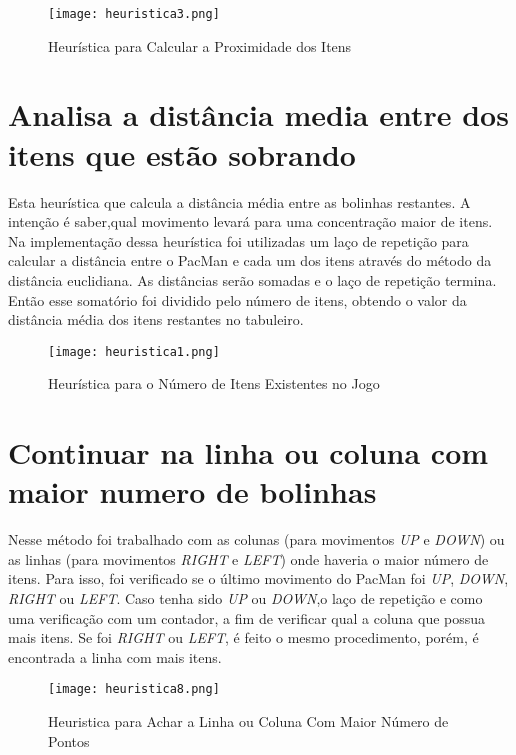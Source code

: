 \documentclass[12pt, a4paper, english, brazil]{abntex2}
\begin{document}
 \begin{figure}[H]
 \centering
 \caption{Heurística para Calcular a Proximidade dos Itens}
 \texttt{[image: heuristica3.png]}
 \label{fig:heuristica3}
 \end{figure}
    

    \section{Analisa a distância media entre dos itens que estão sobrando}
Esta heurística que calcula a distância média entre as bolinhas restantes. A intenção é saber,qual movimento levará para uma concentração maior de itens. Na implementação dessa heurística foi utilizadas um laço de repetição para calcular a distância entre o PacMan e cada um dos itens através do método da distância euclidiana. As distâncias serão somadas e o laço de repetição termina. Então esse somatório foi dividido pelo número de itens, obtendo o valor da distância média dos itens restantes no tabuleiro.

    \begin{figure}[H]
    \centering
    \caption{Heurística para o Número de Itens Existentes no Jogo}
    \texttt{[image: heuristica1.png]}
    \label{fig:heuristica1}
    \end{figure}



    \section{Continuar na linha ou coluna com maior numero de bolinhas }
Nesse método foi trabalhado com as colunas (para movimentos \textit{UP} e \textit{DOWN}) ou as linhas (para movimentos \textit{RIGHT} e \textit{LEFT}) onde haveria o maior número de itens. Para isso, foi verificado se o último movimento do PacMan foi \textit{UP}, \textit{DOWN}, \textit{RIGHT} ou \textit{LEFT}. Caso tenha sido \textit{UP} ou \textit{DOWN},o laço de repetição e como uma verificação com um contador, a fim de verificar qual a coluna que possua mais itens. Se foi \textit{RIGHT} ou \textit{LEFT}, é feito o mesmo procedimento, porém, é encontrada a linha com mais itens. 

\begin{figure}[H]
\centering
\caption{Heuristica para Achar a Linha ou Coluna Com Maior Número de Pontos}
\texttt{[image: heuristica8.png]}
\label{fig:heuristica8}
\end{figure}  
\end{document}
